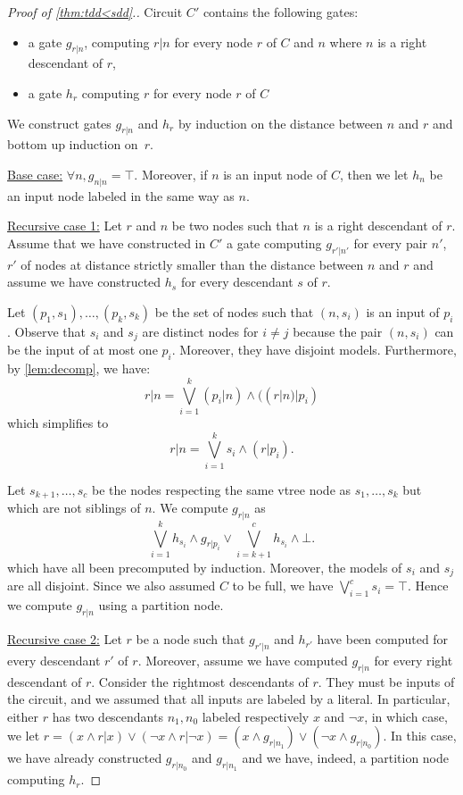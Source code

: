 \documentclass[a4paper,UKenglish,cleveref, autoref, thm-restate]{lipics-v2021}
\newcommand{\guy}[1]{\todo[color=purple]{\color{white}{{\bf Guy}: #1}}}
\begin{document}
\begin{toappendix}
\begin{proof}[Proof of \cref{thm:tdd<sdd}.]
Circuit $C'$ contains the following gates:
\begin{itemize}
\item a gate $g_{r|n}$, computing $r|n$ for every node $r$ of $C$ and $n$ where $n$ is a right descendant of $r$,
\item a gate $h_r$ computing $r$ for every node $r$ of $C$
\end{itemize}
We construct gates $g_{r|n}$ and $h_r$ by induction on the distance between $n$ and $r$ and bottom up induction on~$r$.

\underline{Base case:} $\forall n, g_{n|n} = \top$. Moreover, if $n$ is an input node of $C$, then we let $h_n$ be an input node labeled in the same way as $n$.

\underline{Recursive case 1:}  Let $r$ and $n$ be two nodes such that $n$ is a right descendant of $r$. Assume that we have constructed in $C'$ a gate computing $g_{r'|n'}$ for every pair $n'$, $r'$ of nodes at distance strictly smaller than the distance between $n$ and $r$ and assume we have constructed $h_s$ for every descendant $s$ of $r$.

Let $(p_1,s_1),\dots,(p_k,s_k)$ be the set of nodes such that $(n,s_i)$ is an input of $p_i$. Observe that $s_i$ and $s_j$ are distinct nodes for $i \neq j$ because the pair $(n,s_i)$ can be the input of at most one $p_i$. Moreover, they have disjoint models. Furthermore, by \cref{lem:decomp}, we have: 
\[ r|n = \bigvee_{i=1}^k (p_i|n) \wedge ((r|n) | p_i) \]
which simplifies to
\[ r|n = \bigvee_{i=1}^k s_i \wedge (r|p_i). \]

Let $s_{k+1}, \dots, s_c$ be the nodes respecting the same vtree node as $s_1,\dots,s_k$ but which are not siblings of $n$. We compute $g_{r|n}$ as
\[\bigvee_{i=1}^k h_{s_i} \wedge g_{r|p_i}  \vee \bigvee_{i=k+1}^c h_{s_i} \wedge \bot. \]
which have all been precomputed by induction.  Moreover, the models of $s_i$ and $s_j$ are all disjoint. Since we also assumed $C$ to be full, we have $\bigvee_{i=1}^c s_i= \top$. Hence we compute $g_{r|n}$ using a partition node. 

\underline{Recursive case 2:} Let $r$ be a node such that $g_{r'|n}$ and $h_{r'}$ have been computed for every descendant $r'$ of $r$. Moreover, assume we have computed $g_{r|n}$ for every right descendant of $r$. Consider the rightmost descendants of $r$. They must be inputs of the circuit, and we assumed that all inputs are labeled by a literal. In particular, either $r$ has two descendants $n_1,n_0$ labeled respectively $x$ and $\neg x$, in which case, we let $r = (x \wedge r|x) \vee (\neg x \wedge r|\neg x) = (x \wedge g_{r|n_1}) \vee (\neg x \wedge g_{r|n_0})$. In this case, we have already constructed $g_{r|n_0}$ and $g_{r|n_1}$ and we have, indeed, a partition node computing $h_r$. 


\end{proof}
\end{toappendix}
\end{document}
